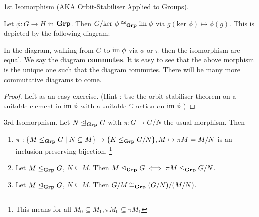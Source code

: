 \documentclass[../book.tex]{subfiles}
\begin{document}
\begin{thm} 1st Isomorphism (AKA Orbit-Stabiliser Applied to Groups). 
    
    Let $\phi : G \to H$ in $\mathbf{Grp}$. 
    Then $G / \text{ker } \phi \cong_{\mathbf{Grp}} \textnormal{im}\; \phi$ 
    via $g(\text{ker }\phi) \mapsto \phi(g)$.
    This is depicted by the following diagram:
    \begin{figure}[ht]
        \centering
    \end{figure}
    In the diagram, walking from $G$ to $\textnormal{im}\; \phi$ via 
    $\phi$ or $\pi$ then the isomorphism are equal. 
    We say the diagram \textbf{commutes}. 
    It is easy to see that the above morphism is the unique one
    such that the diagram commutes. 
    There will be many more commutative diagrams to come. 
\end{thm}
\begin{proof}
    Left as an easy exercise. 
    (Hint : Use the orbit-stabiliser theorem
    on a suitable element in $\textnormal{im}\; \phi$ with a suitable $G$-action on $\textnormal{im}\; \phi$.)
\end{proof}
\begin{thm} 3rd Isomorphism. 
    Let $N \trianglelefteq_{\mathbf{Grp}} G$ with $\pi : G \to G/N$ the usual morphism. Then
    \begin{enumerate}
        \item $\pi : 
        \{M \leq_{\mathbf{Grp}} G \mid N \subseteq M\} \to \{K \leq_{\mathbf{Grp}} G/N\}, 
        M \mapsto \pi M = M/N$ is an inclusion-preserving bijection.
        \footnote{This means for all $M_0\subseteq M_1,
        \pi M_0 \subseteq \pi M_1$}
        \item Let $M \leq_{\mathbf{Grp}} G$, $N \subseteq M$. 
        Then $M \trianglelefteq_{\mathbf{Grp}} G \iff \pi M \trianglelefteq_{\mathbf{Grp}} G/N$. 
        \item Let $M \trianglelefteq_{\mathbf{Grp}} G$, $N \subseteq M$. 
        Then $G / M \cong_{\mathbf{Grp}} (G / N) / (M / N)$. 
    \end{enumerate}
    
\end{thm}
\end{document}
